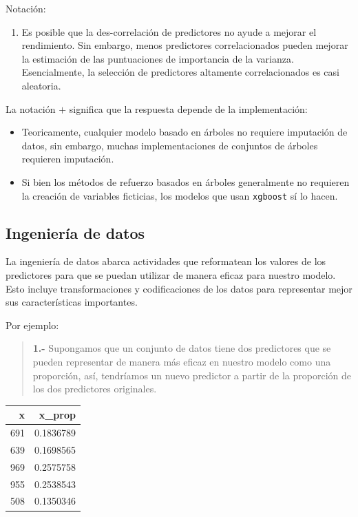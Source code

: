 \documentclass[
]{book}
\providecommand{\tightlist}{%
  \setlength{\itemsep}{0pt}\setlength{\parskip}{0pt}}
\begin{document}
Notación:

\begin{enumerate}
\def\labelenumi{\arabic{enumi}.}
\tightlist
\item
  Es posible que la des-correlación de predictores no ayude a mejorar el rendimiento. Sin embargo, menos predictores correlacionados pueden mejorar la estimación de las puntuaciones de importancia de la varianza.
  Esencialmente, la selección de predictores altamente correlacionados es casi aleatoria.
\end{enumerate}

La notación \(+\) significa que la respuesta depende de la implementación:

\begin{itemize}
\item
  Teoricamente, cualquier modelo basado en árboles no requiere imputación de datos,
  sin embargo, muchas implementaciones de conjuntos de árboles requieren imputación.
\item
  Si bien los métodos de refuerzo basados en árboles generalmente no requieren la creación de variables ficticias, los modelos que usan \texttt{xgboost} sí lo hacen.
\end{itemize}

\hypertarget{ingenieruxeda-de-datos}{%
\subsection{Ingeniería de datos}\label{ingenieruxeda-de-datos}}

La ingeniería de datos abarca actividades que reformatean los valores de los predictores
para que se puedan utilizar de manera eficaz para nuestro modelo.
Esto incluye transformaciones y codificaciones de los datos para representar mejor sus características importantes.

Por ejemplo:

\begin{quote}
\textbf{1.-} Supongamos que un conjunto de datos tiene dos predictores que se pueden representar de manera más eficaz en nuestro modelo como una proporción, así, tendríamos un nuevo predictor a partir de la proporción de los dos predictores originales.
\end{quote}

\begin{table}
\centering
\begin{tabular}[t]{r|r}
\hline
x & x\_prop\\
\hline
691 & 0.1836789\\
\hline
639 & 0.1698565\\
\hline
969 & 0.2575758\\
\hline
955 & 0.2538543\\
\hline
508 & 0.1350346\\
\hline
\end{tabular}
\end{table}
\end{document}
